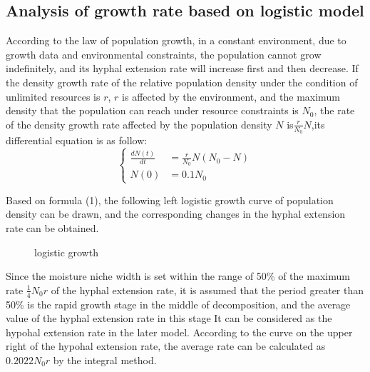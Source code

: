 \documentclass{mcmthesis}
\begin{document}
\subsection{Analysis of growth rate based on logistic model}
According to the law of population growth, in a constant environment, due to growth data and environmental constraints, the population cannot grow indefinitely, and its hyphal extension rate will increase first and then decrease. If the density growth rate of the relative population density under the condition of unlimited resources is $r$, $r$ is affected by the environment, and the maximum density that the population can reach under resource constraints is $N_{0}$, the rate of the density growth rate affected by the population density $N$ is$\frac{r}{N_{0}}N$,its differential equation is as follow:
\begin{equation} 
	\left\{ 
	\begin{aligned}
		\frac{dN(t)}{dt}&=\frac{r}{N_{0}}N(N_{0}-N)
		\\N(0)&=0.1N_{0}
	\end{aligned}
	\right. 
\end{equation} 

Based on formula (1), the following left logistic growth curve of population density can be drawn, and the corresponding changes in the hyphal extension rate can be obtained.
\begin{figure}[h]
	\caption{logistic growth}
\end{figure}

Since the moisture niche width is set within the range of 50\% of the maximum rate $\frac{1}{4}N_{0}r$ of the hyphal extension rate, it is assumed that the period greater than 50\% is the rapid growth stage in the middle of decomposition, and the average value of the hyphal extension rate in this stage It can be considered as the hypohal extension rate in the later model. According to the curve on the upper right of the hypohal extension rate, the average rate can be calculated as $0.2022N_{0}r$ by the integral method.
\end{document}
